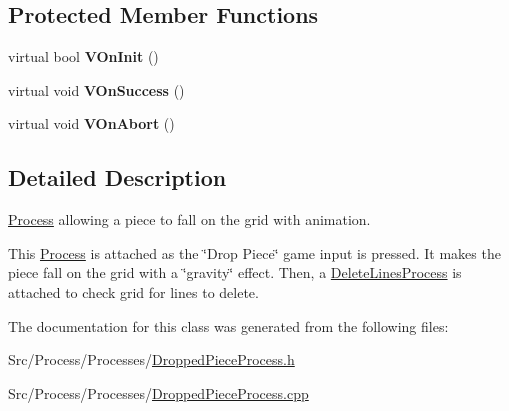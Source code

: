 \subsection*{Protected Member Functions}
\begin{DoxyCompactItemize}
\item 
\hypertarget{classDroppedPieceProcess_a3f9b6a73f8638bae6bb5713ad3e0d899}{virtual bool {\bfseries V\-On\-Init} ()}\label{classDroppedPieceProcess_a3f9b6a73f8638bae6bb5713ad3e0d899}

\item 
\hypertarget{classDroppedPieceProcess_a5fdf30a0f18ded296778bf4000a12f28}{virtual void {\bfseries V\-On\-Success} ()}\label{classDroppedPieceProcess_a5fdf30a0f18ded296778bf4000a12f28}

\item 
\hypertarget{classDroppedPieceProcess_af58fbcf677fc1a0f604d3f2b1e703681}{virtual void {\bfseries V\-On\-Abort} ()}\label{classDroppedPieceProcess_af58fbcf677fc1a0f604d3f2b1e703681}

\end{DoxyCompactItemize}


\subsection{Detailed Description}
\hyperlink{classProcess}{Process} allowing a piece to fall on the grid with animation. 

This \hyperlink{classProcess}{Process} is attached as the \char`\"{}\-Drop Piece\char`\"{} game input is pressed. It makes the piece fall on the grid with a \char`\"{}gravity\char`\"{} effect. Then, a \hyperlink{classDeleteLinesProcess}{Delete\-Lines\-Process} is attached to check grid for lines to delete. 

The documentation for this class was generated from the following files\-:\begin{DoxyCompactItemize}
\item 
Src/\-Process/\-Processes/\hyperlink{DroppedPieceProcess_8h}{Dropped\-Piece\-Process.\-h}\item 
Src/\-Process/\-Processes/\hyperlink{DroppedPieceProcess_8cpp}{Dropped\-Piece\-Process.\-cpp}\end{DoxyCompactItemize}
